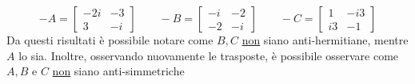 \documentclass[a4paper]{article}
\begin{document}
	\begin{equation*}
		-A = \begin{bmatrix}
			-2i	& -3	\\
			3	& -i
		\end{bmatrix} \hspace{2em}
		-B = \begin{bmatrix}
			-i 	& -2	\\
			-2	& -i
		\end{bmatrix} \hspace{2em}
		-C = \begin{bmatrix}
			1 	& -i3	\\
			i3	& -1
		\end{bmatrix}
	\end{equation*}
	Da questi risultati è possibile notare come $B,C$ \underline{non} siano anti-hermitiane, mentre $A$ lo sia. Inoltre, osservando nuovamente le trasposte, è possibile osservare come $A, B$ e $C$ \underline{non} siano anti-simmetriche
\end{document}
